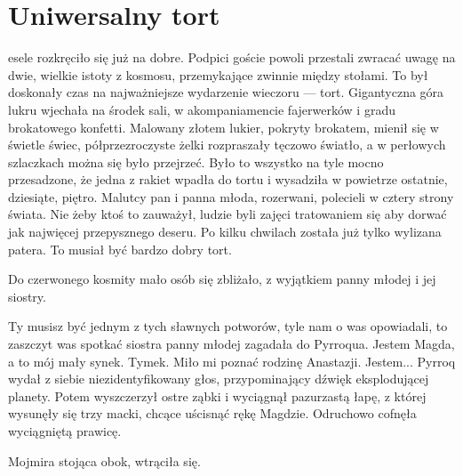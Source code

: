 \chapter{Uniwersalny tort}



esele rozkręciło się już na dobre. 
Podpici goście powoli przestali zwracać uwagę na dwie, wielkie istoty z kosmosu, przemykające zwinnie między stołami.
To był doskonały czas na najważniejsze wydarzenie wieczoru --- tort.
Gigantyczna góra lukru wjechała na środek sali, w akompaniamencie fajerwerków i gradu brokatowego konfetti. 
Malowany złotem lukier, pokryty brokatem, mienił się w świetle świec, półprzezroczyste żelki rozpraszały tęczowo światło, a w perłowych szlaczkach można się było przejrzeć.
Było to wszystko na tyle mocno przesadzone, że jedna z rakiet wpadła do tortu i wysadziła w powietrze ostatnie, dziesiąte, piętro.
Malutcy pan i panna młoda, rozerwani, polecieli w cztery strony świata.
Nie żeby ktoś to zauważył, ludzie byli zajęci tratowaniem się aby dorwać jak najwięcej przepysznego deseru. 
Po kilku chwilach została już tylko wylizana patera. To musiał być bardzo dobry tort.

Do czerwonego kosmity mało osób się zbliżało, z wyjątkiem panny młodej i jej siostry.

\begin{dialogue}
\ds{} Ty musisz być jednym z tych sławnych potworów, tyle nam o was opowiadali, to zaszczyt was spotkać \dm{} siostra panny młodej zagadała do Pyrroqua. \dm{}
Jestem Magda, a to mój mały synek. Tymek.
\ds{} Miło mi poznać rodzinę Anastazji. Jestem... \dm{} Pyrroq wydał z siebie niezidentyfikowany głos, przypominający dźwięk eksplodującej planety.
Potem wyszczerzył ostre ząbki i wyciągnął pazurzastą łapę, z której wysunęły się trzy macki, chcące uścisnąć rękę Magdzie. Odruchowo cofnęła wyciągniętą prawicę.
\end{dialogue}

Mojmira stojąca obok, wtrąciła się.

